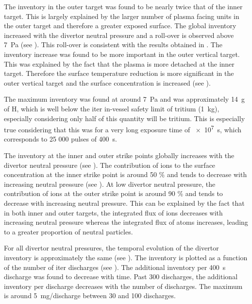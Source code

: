 The \gls{inventory} in the outer target was found to be nearly twice that of the inner target.
This is largely explained by the larger number of plasma facing units in the outer target and therefore a greater exposed surface.
The global \gls{inventory} increased with the \gls{divertor} neutral pressure and a roll-over is observed above \SI{7}{Pa} (see ).
This roll-over is consistent with the results obtained in .
The \gls{inventory} increase was found to be more important in the outer vertical target.
This was explained by the fact that the plasma is more detached at the inner target.
Therefore the surface temperature reduction is more significant in the outer vertical target and the surface concentration is increased (see ).

The maximum \gls{inventory} was found at around \SI{7}{Pa} and was approximately \SI{14}{g} of H, which is well below the \gls{iter} in-vessel safety limit of tritium (\SI{1}{kg}), especially considering only half of this quantity will be tritium.
This is especially true considering that this was for a very long exposure time of \SI{e7}{s}, which corresponds to 25 000 pulses of \SI{400}{s}.


The inventory at the inner and outer \glspl{strike point} globally increases with the \gls{divertor} neutral pressure (see ).
The contribution of ions to the surface concentration at the inner strike point is around 50 \% and tends to decrease with increasing neutral pressure (see ).
At low \gls{divertor} neutral pressure, the contribution of ions at the outer strike point is around 90 \% and tends to decrease with increasing neutral pressure.
This can be explained by the fact that in both inner and outer targets, the integrated flux of ions decreases with increasing neutral pressure whereas the integrated flux of atoms increases, leading to a greater proportion of neutral particles.

For all \gls{divertor} neutral pressures, the temporal evolution of the \gls{divertor} \gls{inventory} is approximately the same (see ).
The \gls{inventory} is plotted as a function of the number of \gls{iter} discharges (see ).
The additional \gls{inventory} per \SI{400}{s} discharge was found to decrease with time.
Past 300 discharges, the additional \gls{inventory} per discharge decreases with the number of discharges.
The maximum is around \SI{5}{mg/discharge} between 30 and 100 discharges.

